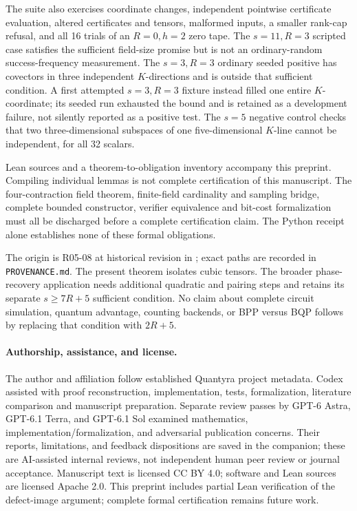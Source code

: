 \documentclass[11pt]{article}
\begin{document}
The suite also exercises coordinate changes, independent pointwise certificate
evaluation, altered certificates and tensors, malformed inputs, a smaller
rank-cap refusal, and all 16 trials of an $R=0,h=2$ zero tape. The $s=11,R=3$
scripted case satisfies the sufficient field-size promise but is not an
ordinary-random success-frequency measurement. The $s=3,R=3$ ordinary seeded
positive has covectors in three independent $K$-directions and is outside
that sufficient condition. A first attempted $s=3,R=3$ fixture instead filled
one entire $K$-coordinate; its seeded run exhausted the bound and is retained
as a development failure, not silently reported as a positive test. The
$s=5$ negative control checks that two three-dimensional subspaces of one
five-dimensional $K$-line cannot be independent, for all 32 scalars.

Lean sources and a theorem-to-obligation inventory accompany this preprint.
Compiling individual lemmas is not complete certification of this manuscript.
The four-contraction field theorem, finite-field cardinality and sampling
bridge, complete bounded constructor, verifier equivalence and bit-cost
formalization must all be discharged before a complete certification claim.
The Python receipt alone establishes none of these formal obligations.

The origin is R05-08 at historical revision
 in
; exact paths are recorded in
\texttt{PROVENANCE.md}. The present theorem isolates cubic tensors. The
broader phase-recovery application needs additional quadratic and pairing
steps and retains its separate $s\geq7R+5$ sufficient condition. No claim
about complete circuit simulation, quantum advantage, counting backends,
or BPP versus BQP follows by replacing that condition with $2R+5$.

\paragraph{Authorship, assistance, and license.}
The author and affiliation follow established Quantyra project metadata.
Codex assisted with proof reconstruction, implementation, tests, formalization,
literature comparison and manuscript preparation. Separate review passes by
GPT-6 Astra, GPT-6.1 Terra, and GPT-6.1 Sol examined mathematics,
implementation/formalization, and adversarial publication concerns. Their
reports, limitations, and feedback dispositions are saved in the companion;
these are AI-assisted internal reviews, not independent human peer review or
journal acceptance. Manuscript text is licensed CC BY 4.0; software and Lean
sources are licensed Apache 2.0. This preprint includes partial Lean verification
of the defect-image argument; complete formal certification remains future work.
\end{document}
